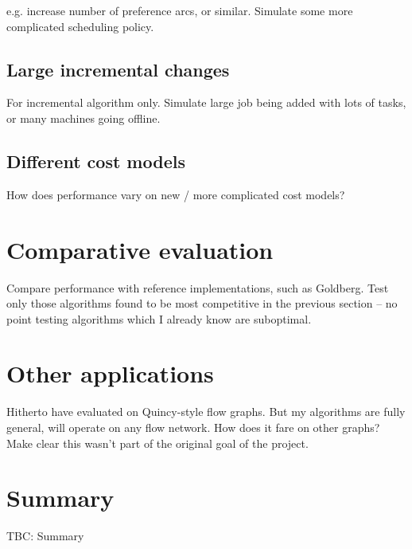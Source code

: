 e.g. increase number of preference arcs, or similar. Simulate some more complicated scheduling policy.

\subsection{Large incremental changes}

For incremental algorithm only. Simulate large job being added with lots of tasks, or many machines going offline.

\subsection{Different cost models}

How does performance vary on new / more complicated cost models?

\section{Comparative evaluation} \label{sec:eval-comparative}

Compare performance with reference implementations, such as Goldberg. Test only those algorithms found to be most competitive in the previous section -- no point testing algorithms which I already know are suboptimal.

\section{Other applications}

Hitherto have evaluated on Quincy-style flow graphs. But my algorithms are fully general, will operate on any flow network. How does it fare on other graphs? Make clear this wasn't part of the original goal of the project.

\section{Summary}

TBC: Summary